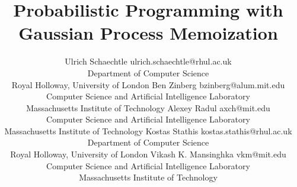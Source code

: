 \documentclass[twoside,11pt]{article}
\begin{document}
\title{Probabilistic Programming with Gaussian Process Memoization}


\author{\name Ulrich Schaechtle \email ulrich.schaechtle@rhul.ac.uk \\
	      \addr Department of Computer Science\\
              Royal Holloway, University of London
       \AND \name Ben Zinberg \email bzinberg@alum.mit.edu \\
              \addr Computer Science and Artificial Intelligence Laboratory\\
              Massachusetts Institute of Technology
       \AND \name Alexey Radul \email axch@mit.edu \\
              \addr Computer Science and Artificial Intelligence Laboratory\\
              Massachusetts Institute of Technology
       \AND \name Kostas Stathis \email kostas.stathis@rhul.ac.uk\\
              \addr Department of Computer Science\\
       Royal Holloway, University of London
       \AND \name Vikash K. Mansinghka \email vkm@mit.edu \\
	      \addr Computer Science and Artificial Intelligence Laboratory\\
	      Massachusetts Institute of Technology
} 

\end{document}
